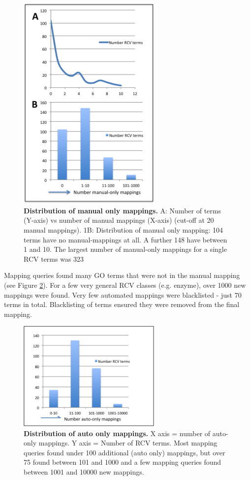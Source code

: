 \documentclass[runningheads,a4paper]{llncs}
\begin{document}
{{ 
\begin{figure}
\centering
\includegraphics[width=70mm]{man_only.png}
\caption{\textbf{Distribution of manual only mappings.} A: Number of terms (Y-axis) vs number of manual mappings (X-axis) (cut-off at 20 manual mappings). 1B: Distribution of manual only mapping: 104 terms have no manual-mappings at all.  A further 148 have between 1 and 10.  The largest number of manual-only mappings for a single RCV terms was 323}
\label{fig:man_only}
\end{figure}
 
Mapping queries found many \ac{GO} terms that were not in the manual mapping (see Figure \ref{fig:auto_only}).  For a few very general RCV classes (e.g. enzyme), over 1000 new mappings were found. Very few automated mappings were blacklisted - just 70 terms in total.  Blacklisting of terms ensured they were removed from the final mapping.

\begin{figure}
\centering
\includegraphics[width=70mm]{auto_only.png}
\caption{\textbf{Distribution of auto only mappings.}
X axis = number of auto-only mappings.  Y axis = Number of RCV terms.  Most mapping queries found under 100 additional (auto only) mappings, but over 75 found between 101 and 1000 and a few mapping queries found between 1001 and 10000 new mappings.}
\label{fig:auto_only}
\end{figure}

}}
\end{document}
